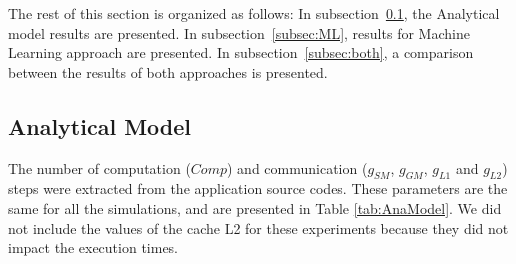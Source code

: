 The rest of this section is organized as follows: In subsection~\ref{subsec:Anamodel}, the Analytical model results are presented. In subsection~\ref{subsec:ML}, results for Machine Learning approach are presented. In subsection~\ref{subsec:both}, a comparison between the results of both approaches is presented.

\subsection{Analytical Model}\label{subsec:Anamodel}
The number of computation ($Comp$) and communication ($g_{SM}$, $g_{GM}$, $g_{L1}$ and $g_{L2}$) steps were extracted from the application source codes. These parameters are the same for all the simulations, and are presented in Table \ref{tab:AnaModel}. We did not include the values of the cache L2 for these experiments because they did not impact the execution times.

\begin{table}[H]
\centering
\caption{Values of the model parameters over 9 different applications}
\label{tab:AnaModel} %
\end{table}

